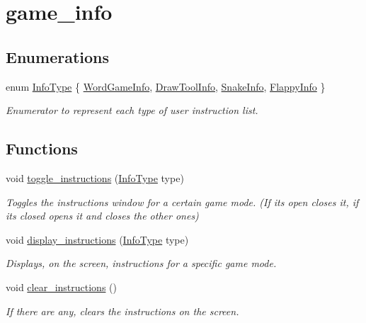 \hypertarget{group__game__info}{}\section{game\+\_\+info}
\label{group__game__info}
\subsection*{Enumerations}
\begin{DoxyCompactItemize}
\item 
enum \mbox{\hyperlink{group__game__info_ga4fab2721054fd66cc89f138fd029fd1f}{Info\+Type}} \{ \mbox{\hyperlink{group__game__info_gga4fab2721054fd66cc89f138fd029fd1fad3ae75698145fe0aef09676e18c5431d}{Word\+Game\+Info}}, 
\mbox{\hyperlink{group__game__info_gga4fab2721054fd66cc89f138fd029fd1fa3f940f912c3efd5760c975fb23863566}{Draw\+Tool\+Info}}, 
\mbox{\hyperlink{group__game__info_gga4fab2721054fd66cc89f138fd029fd1fa637c0539d431d722bfc3d8735a5fb2b2}{Snake\+Info}}, 
\mbox{\hyperlink{group__game__info_gga4fab2721054fd66cc89f138fd029fd1fa12d6425ca4d0e3eac79984b4facf249f}{Flappy\+Info}}
 \}
\begin{DoxyCompactList}\small\item\em Enumerator to represent each type of user instruction list. \end{DoxyCompactList}\end{DoxyCompactItemize}
\subsection*{Functions}
\begin{DoxyCompactItemize}
\item 
void \mbox{\hyperlink{group__game__info_gaa555b2189fe80ff7c8095d0c80353c2d}{toggle\+\_\+instructions}} (\mbox{\hyperlink{group__game__info_ga4fab2721054fd66cc89f138fd029fd1f}{Info\+Type}} type)
\begin{DoxyCompactList}\small\item\em Toggles the instructions window for a certain game mode. (If it\textquotesingle{}s open closes it, if it\textquotesingle{}s closed opens it and closes the other ones) \end{DoxyCompactList}\item 
void \mbox{\hyperlink{group__game__info_ga6b00da117e65804d334e303e48a33a49}{display\+\_\+instructions}} (\mbox{\hyperlink{group__game__info_ga4fab2721054fd66cc89f138fd029fd1f}{Info\+Type}} type)
\begin{DoxyCompactList}\small\item\em Displays, on the screen, instructions for a specific game mode. \end{DoxyCompactList}\item 
void \mbox{\hyperlink{group__game__info_gaab96e5ba2a7e443add23ff59fb5f43c9}{clear\+\_\+instructions}} ()
\begin{DoxyCompactList}\small\item\em If there are any, clears the instructions on the screen. \end{DoxyCompactList}\end{DoxyCompactItemize}


